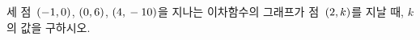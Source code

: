 \hspace*{2mm}\begin{minipage}[t]{\dimexpr\linewidth-2mm\relax}\vspace{0pt}
세 점~$(-1{,}\mkern3mu 0)$, $(0{,}\mkern3mu 6)$, $(4{,}\mkern3mu -10)$을 지나는 이차함수의 그래프가 점~$(2{,}\mkern3mu k)$를 지날 때, $k$의 값을 구하시오.\end{minipage}
